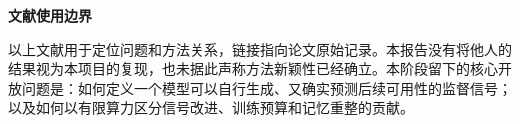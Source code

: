 \documentclass[11pt,a4paper]{article}
\begin{document}
\vspace{5mm}
\noindent\textbf{文献使用边界}\par
以上文献用于定位问题和方法关系，链接指向论文原始记录。本报告没有将他人的结果视为本项目的复现，也未据此声称方法新颖性已经确立。本阶段留下的核心开放问题是：如何定义一个模型可以自行生成、又确实预测后续可用性的监督信号；以及如何以有限算力区分信号改进、训练预算和记忆重整的贡献。
\vfill
{}
\end{document}
